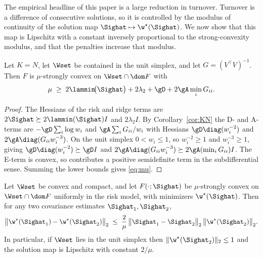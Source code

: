 The empirical headline of this paper is a large reduction in turnover. Turnover
is a difference of consecutive solutions, so it is controlled by the modulus of
continuity of the solution map $\Sighat\mapsto\w^\star(\Sighat)$. We now show that
this map is Lipschitz with a constant inversely proportional to the
strong-convexity modulus, and that the penalties increase that modulus.

\begin{lemma}
\label{lem:modulus}
Let $K=N$, let $\Wset$ be contained in the unit simplex, and let
$G=(V^\top V)^{-1}$. Then $F$ is $\mu$-strongly convex on $\Wset\cap\dom F$ with
\begin{equation}
  \mu\;\ge\;2\lammin\!\big(\Sighat\big)+2\lambda_2+\gD+2\gA\min_iG_{ii} .
  \label{eq:mu}
\end{equation}
\end{lemma}

\begin{proof}
The Hessians of the risk and ridge terms are $2\Sighat\succeq2\lammin(\Sighat)I$
and $2\lambda_2I$. By Corollary~\ref{cor:KN} the D- and A-terms are
$-\gD\sum_i\log w_i$ and $\gA\sum_iG_{ii}/w_i$ with Hessians
$\gD\diag(w_i^{-2})$ and $2\gA\diag(G_{ii}w_i^{-3})$. On the unit simplex
$0<w_i\le1$, so $w_i^{-2}\ge1$ and $w_i^{-3}\ge1$, giving
$\gD\diag(w_i^{-2})\succeq\gD I$ and
$2\gA\diag(G_{ii}w_i^{-3})\succeq2\gA(\min_iG_{ii})I$. The E-term is convex, so
contributes a positive semidefinite term in the subdifferential sense. Summing
the lower bounds gives \eqref{eq:mu}.
\end{proof}

\begin{theorem}
\label{thm:stability}
Let $\Wset$ be convex and compact, and let $F(\cdot;\Sighat)$ be $\mu$-strongly
convex on $\Wset\cap\dom F$ uniformly in the risk model, with minimizers
$\w^\star(\Sighat)$. Then for any two covariance estimates $\Sighat_1,\Sighat_2$,
\begin{equation}
  \big\lVert\w^\star(\Sighat_1)-\w^\star(\Sighat_2)\big\rVert_2
  \;\le\;\frac{2}{\mu}\,\big\lVert\Sighat_1-\Sighat_2\big\rVert_2\,
  \big\lVert\w^\star(\Sighat_2)\big\rVert_2 .
  \label{eq:stability}
\end{equation}
In particular, if $\Wset$ lies in the unit simplex then
$\lVert\w^\star(\Sighat_2)\rVert_2\le1$ and the solution map is Lipschitz with
constant $2/\mu$.
\end{theorem}

